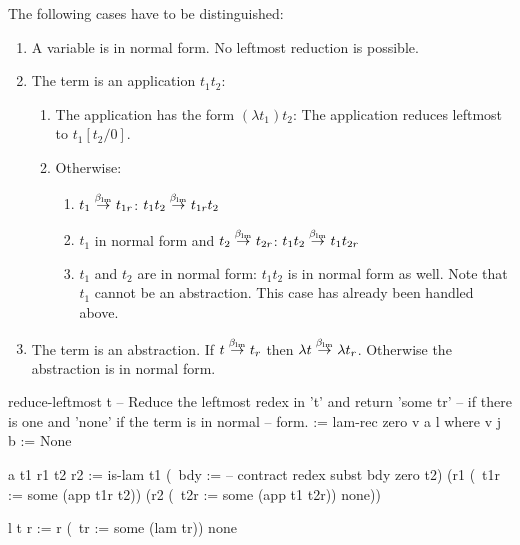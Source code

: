 \documentclass[12pt]{article}
\begin{document}
The following cases have to be distinguished:
\begin{enumerate}
    \item A variable is in normal form. No leftmost reduction is possible.

    \item The term is an application $t_1 t_2$:
        \begin{enumerate}
            \item The application has the form $(\lambda t_1) t_2$: The
                application reduces leftmost to $t_1[t_2/0]$.

            \item Otherwise:
                \begin{enumerate}
                    \item $t_1 \stackrel{\beta_{\text{lm}}}\to t_{1r}$: $t_1 t_2 \stackrel{\beta_{\text{lm}}}\to t_{1r} t_2$

                    \item $t_1$ in normal form and $t_2 \stackrel{\beta_{\text{lm}}}\to t_{2r}$:
                        $t_1 t_2 \stackrel{\beta_{\text{lm}}}\to t_1 t_{2r}$

                    \item $t_1$ and $t_2$ are in normal form: $t_1 t_2$ is in
                        normal form as well. Note that $t_1$ cannot be an
                        abstraction. This case has already been handled above.
                \end{enumerate}
        \end{enumerate}

    \item The term is an abstraction. If $t \stackrel{\beta_{\text{lm}}}\to t_r$ then $\lambda t
        \stackrel{\beta_{\text{lm}}}\to \lambda t_r$. Otherwise the abstraction is in normal
        form.
\end{enumerate}

\begin{lam}
    reduce-leftmost t
        -- Reduce the leftmost redex in 't' and return 'some tr'
        -- if there is one and 'none' if the term is in normal
        -- form.
    :=
        lam-rec zero v a l where
            v j b :=
                None

            a t1 r1 t2 r2 :=
                is-lam t1
                    (\ bdy :=        -- contract redex
                         subst bdy zero t2)
                    (r1
                        (\ t1r := some (app t1r t2))
                        (r2
                            (\ t2r := some (app t1 t2r))
                            none))

            l t r :=
                r (\ tr := some (lam tr)) none
                
                
\end{lam}
\end{document}
